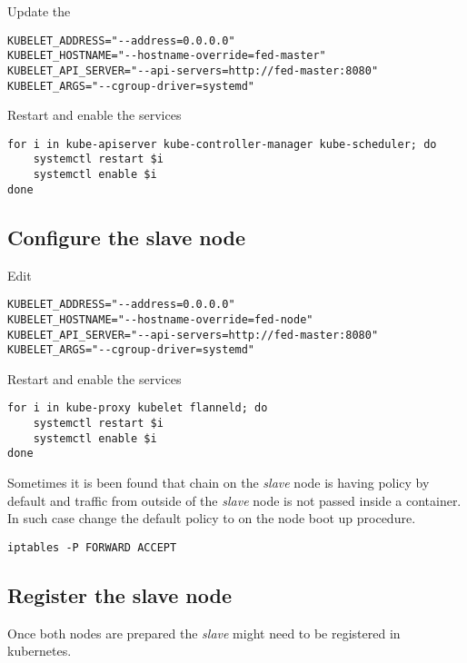 Update the 

\begin{lstlisting}
KUBELET_ADDRESS="--address=0.0.0.0"
KUBELET_HOSTNAME="--hostname-override=fed-master"
KUBELET_API_SERVER="--api-servers=http://fed-master:8080"
KUBELET_ARGS="--cgroup-driver=systemd"
\end{lstlisting}

Restart and enable the services

\begin{lstlisting}
for i in kube-apiserver kube-controller-manager kube-scheduler; do
    systemctl restart $i
    systemctl enable $i
done
\end{lstlisting}

\subsection{Configure the slave node}
\label{subsec:setup-kuber-slave}

Edit 

\begin{lstlisting}
KUBELET_ADDRESS="--address=0.0.0.0"
KUBELET_HOSTNAME="--hostname-override=fed-node"
KUBELET_API_SERVER="--api-servers=http://fed-master:8080"
KUBELET_ARGS="--cgroup-driver=systemd"
\end{lstlisting}

Restart and enable the services

\begin{lstlisting}
for i in kube-proxy kubelet flanneld; do
    systemctl restart $i
    systemctl enable $i
done
\end{lstlisting}

Sometimes it is been found that  chain on
the \emph{slave} node is having  policy by default
and traffic from outside of the \emph{slave} node is not
passed inside a container. In such case change the default
policy to  on the node boot up procedure.

\begin{lstlisting}
iptables -P FORWARD ACCEPT
\end{lstlisting}

\subsection{Register the slave node}
\label{subsec:setup-kuber-register-slave}

Once both nodes are prepared the \emph{slave} might need
to be registered in kubernetes.

